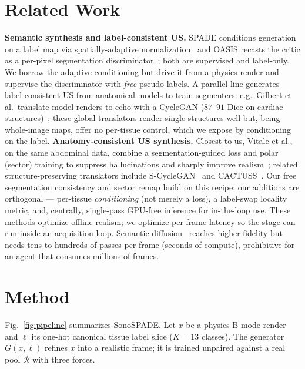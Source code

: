 \documentclass[runningheads]{llncs}
\begin{document}
\section{Related Work}
\noindent\textbf{Semantic synthesis and label-consistent US.} SPADE conditions generation on a label
map via spatially-adaptive normalization~\cite{park2019spade} and OASIS recasts the critic as a
per-pixel segmentation discriminator~\cite{sushko2021oasis}; both are supervised and label-only. We
borrow the adaptive conditioning but drive it from a physics render and supervise the discriminator with
\emph{free} pseudo-labels. A parallel line generates label-consistent US from anatomical models to train
segmenters: e.g.\ Gilbert et al.\ translate model renders to echo with a CycleGAN ($87$--$91$ Dice on
cardiac structures)~\cite{gilbert2021synthetic}; these global translators render single structures well
but, being whole-image maps, offer no per-tissue control, which we expose by conditioning on the label.
\noindent\textbf{Anatomy-consistent US synthesis.} Closest to us, Vitale et al., on the same abdominal
data, combine a segmentation-guided loss and polar (sector) training to suppress hallucinations and
sharply improve realism~\cite{vitale2025realism}; related structure-preserving translators include
S-CycleGAN~\cite{song2024scyclegan,zhu2017cyclegan} and CACTUSS~\cite{velikova2022cactuss}. Our free
segmentation consistency and sector remap build on this recipe; our additions are orthogonal --- per-tissue
\emph{conditioning} (not merely a loss), a label-swap locality metric, and, centrally, single-pass
GPU-free inference for in-the-loop use. These methods optimize offline realism; we optimize per-frame
latency so the stage can run inside an acquisition loop. Semantic
diffusion~\cite{stojanovski2023echofromnoise} reaches higher fidelity but needs tens to hundreds of
passes per frame (seconds of compute), prohibitive for an agent that consumes millions of frames.

\section{Method}
Fig.~\ref{fig:pipeline} summarizes SonoSPADE. Let $x$ be a physics B-mode render and $\ell$ its
one-hot canonical tissue label slice ($K{=}13$ classes). The generator $G(x,\ell)$ refines $x$ into a
realistic frame; it is trained unpaired against a real pool $\mathcal{R}$ with three forces.
\end{document}
